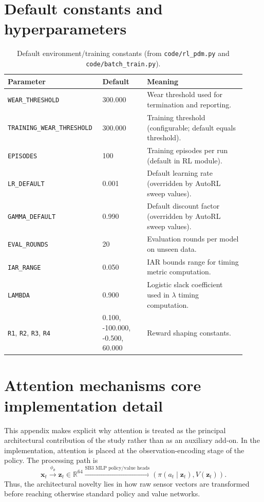 \documentclass[sn-basic]{sn-jnl} %
\begin{document}
\begin{appendices}
\section{Default constants and hyperparameters}
\label{app:defaults}
\begin{table}[t]
\centering
\caption{Default environment/training constants (from \texttt{code/rl\_pdm.py} and \texttt{code/batch\_train.py}).}
\label{tab:defaults}
\begin{tabular}{p{0.34\linewidth} p{0.18\linewidth} p{0.40\linewidth}}
\toprule
\textbf{Parameter} & \textbf{Default} & \textbf{Meaning}\\
\midrule
\texttt{WEAR\_THRESHOLD} & 300.000 & Wear threshold used for termination and reporting.\\
\texttt{TRAINING\_WEAR\_THRESHOLD} & 300.000 & Training threshold (configurable; default equals threshold).\\
\texttt{EPISODES} & 100 & Training episodes per run (default in RL module).\\
\texttt{LR\_DEFAULT} & 0.001 & Default learning rate (overridden by AutoRL sweep values).\\
\texttt{GAMMA\_DEFAULT} & 0.990 & Default discount factor (overridden by AutoRL sweep values).\\
\texttt{EVAL\_ROUNDS} & 20 & Evaluation rounds per model on unseen data.\\
\texttt{IAR\_RANGE} & 0.050 & IAR bounds range for timing metric computation.\\
\texttt{LAMBDA} & 0.900 & Logistic slack coefficient used in $\lambda$ timing computation.\\
\texttt{R1}, \texttt{R2}, \texttt{R3}, \texttt{R4} & 0.100, -100.000, -0.500, 60.000 & Reward shaping constants.\\
\bottomrule
\end{tabular}
\end{table}

\section{Attention mechanisms core implementation detail}
\label{app:attn_core_impl}
This appendix makes explicit why attention is treated as the principal architectural contribution of the study rather than as an auxiliary add-on. In the implementation, attention is placed at the observation-encoding stage of the policy. The processing path is
\begin{equation}
\mathbf{x}_t \xrightarrow{\phi_\theta} \mathbf{z}_t \in \mathbb{R}^{64} \xrightarrow{\text{SB3 MLP policy/value heads}} \left(\pi(a_t\mid \mathbf{z}_t), V(\mathbf{z}_t)\right).
\end{equation}
Thus, the architectural novelty lies in how raw sensor vectors are transformed before reaching otherwise standard policy and value networks.


\end{appendices}
\end{document}
